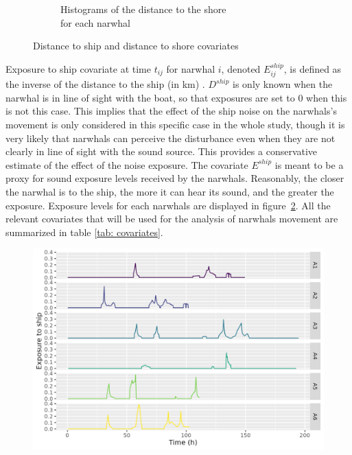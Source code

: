 \documentclass[11pt]{article}
\newcommand {\1}{\mathbb{1}}
\begin{document}
\begin{figure}[H]
\begin{subfigure}{0.48\textwidth}
    \caption{Histograms of the distance to the shore \\ for each narwhal}
    \end{subfigure}
    \caption{Distance to ship and distance to shore covariates}
    \label{fig: distance to shore and distance to ship histograms}
\end{figure}


Exposure to ship covariate at time $t_{ij}$ for narwhal $i$, denoted $E^{ship}_{ij}$, is defined as the inverse of the distance to the ship (in km) \cite{heide-jorgensen_behavioral_2021}.
$D^{ship}$ is only known when the narwhal is in line of sight with the boat, so that exposures are set to $0$ when this is not this case. This implies that the effect of the ship noise on the narwhals's movement is only considered in this specific case in the whole study, though it is very likely that narwhals can perceive the disturbance even when they are not clearly in line of sight with the sound source. This provides a conservative estimate of the effect of the noise exposure. The covariate $E^{ship}$ is meant to be a proxy for sound exposure levels received by the narwhals. Reasonably, the closer the narwhal is to the ship, the more it can hear its sound, and the greater the exposure. Exposure levels for each narwhals are displayed in figure~\ref{fig: realexpthroughtime}. All the relevant covariates that will be used for the analysis of narwhals movement are summarized in table \ref{tab: covariates}.


\begin{figure}[H]
	\centering
	\includegraphics[width=0.7\linewidth]{images/data_exploration/realExp_through_time}
	\caption{}
	\label{fig: realexpthroughtime}
\end{figure}
\end{document}
